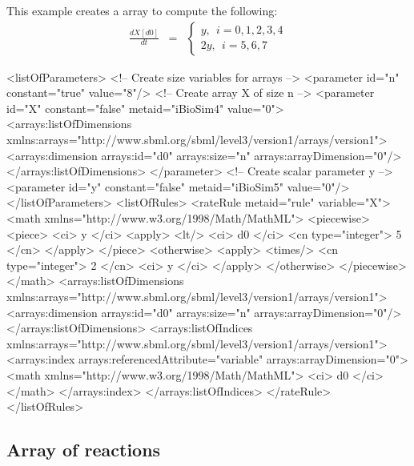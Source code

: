 This example creates a \RateRule array to compute the following:
\begin{eqnarray*}
\frac{dX[d0]}{dt} & = & \left\{ \begin{array}{l}
  y,~~i = 0, 1, 2, 3, 4 \\
 2y,~~i = 5, 6, 7 
\end{array}
\right.
\end{eqnarray*}
\begin{example}
<listOfParameters>
    <!-- Create size variables for arrays -->
    <parameter id="n" constant="true" value="8"/>
    <!-- Create array X of size n -->
    <parameter id="X" constant="false" metaid="iBioSim4" value="0">
        <arrays:listOfDimensions
            xmlns:arrays="http://www.sbml.org/sbml/level3/version1/arrays/version1">
            <arrays:dimension arrays:id="d0" arrays:size="n" arrays:arrayDimension="0"/>
        </arrays:listOfDimensions>
    </parameter>
    <!-- Create scalar parameter y -->
    <parameter id="y" constant="false" metaid="iBioSim5" value="0"/>
</listOfParameters>
<listOfRules>
    <rateRule metaid="rule" variable="X">
        <math xmlns="http://www.w3.org/1998/Math/MathML">
            <piecewise>
                <piece>
                    <ci> y </ci>
                    <apply>
                        <lt/>
                        <ci> d0 </ci>
                        <cn type="integer"> 5 </cn>
                    </apply>
                </piece>
                <otherwise>
                    <apply>
                        <times/>
                        <cn type="integer"> 2 </cn>
                        <ci> y </ci>
                    </apply>
                </otherwise>
            </piecewise>
        </math>
        <arrays:listOfDimensions
            xmlns:arrays="http://www.sbml.org/sbml/level3/version1/arrays/version1">
            <arrays:dimension arrays:id="d0" arrays:size="n" arrays:arrayDimension="0"/>
        </arrays:listOfDimensions>
        <arrays:listOfIndices
            xmlns:arrays="http://www.sbml.org/sbml/level3/version1/arrays/version1">
            <arrays:index arrays:referencedAttribute="variable" arrays:arrayDimension="0">
                <math xmlns="http://www.w3.org/1998/Math/MathML">
                    <ci> d0 </ci>
                </math>
            </arrays:index>
        </arrays:listOfIndices>
    </rateRule>
</listOfRules>
\end{example}

\subsection{Array of reactions}

